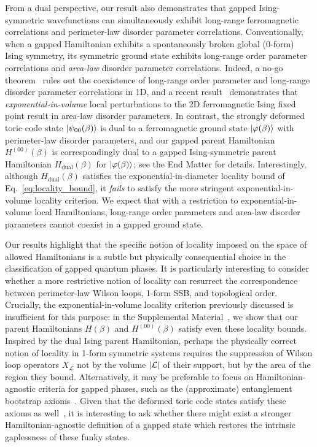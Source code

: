 \documentclass[aps,prl,twocolumn,floatfix,nofootinbib]{revtex4-2}
\theoremstyle{definition}
\begin{document}
{From a dual perspective, our result also demonstrates that gapped Ising-symmetric wavefunctions can simultaneously exhibit long-range ferromagnetic correlations and perimeter-law disorder parameter correlations. Conventionally, when a gapped Hamiltonian exhibits a spontaneously broken global (0-form) Ising symmetry, its symmetric ground state exhibits long-range order parameter correlations and \emph{area-law} disorder parameter correlations. Indeed, a no-go theorem~\cite{Levin_constraints_2020} rules out the coexistence of long-range order parameter and long-range disorder parameter correlations in 1D, and a recent result~\cite{McDonough_Zhang_lieb-robinson_2025} demonstrates that \emph{exponential-in-volume} local perturbations to the 2D ferromagnetic Ising fixed point result in area-law disorder parameters. In contrast, the strongly deformed toric code state $\ket{\psi_{00}(\beta)}$ is dual to a ferromagnetic ground state $\ket{\varphi(\beta)}$ with perimeter-law disorder parameters, and our gapped parent Hamiltonian $H^{(00)}(\beta)$ is correspondingly dual to a gapped Ising-symmetric parent Hamiltonian $H_{\text{dual}}(\beta)$ for $\ket{\varphi(\beta)}$; see the End Matter for details. Interestingly, although $H_{\text{dual}}(\beta)$ satisfies the exponential-in-diameter locality bound of Eq.~\eqref{eq:locality_bound}, it \emph{fails} to satisfy the more stringent exponential-in-volume locality criterion. We expect that with a restriction to exponential-in-volume local Hamiltonians, long-range order parameters and area-law disorder parameters cannot coexist in a gapped ground state.}

{Our results highlight that the specific notion of locality imposed on the space of allowed Hamiltonians is a subtle but physically consequential choice in the classification of gapped quantum phases. It is particularly interesting to consider whether a more restrictive notion of locality can resurrect the correspondence between perimeter-law Wilson loops, 1-form SSB, and topological order. Crucially, the exponential-in-volume locality criterion previously discussed is insufficient for this purpose: in the Supplemental Material~\cite{SOM}, we show that our parent Hamiltonians $H(\beta)$ and $H^{(00)}(\beta)$ satisfy even these locality bounds. Inspired by the dual Ising parent Hamiltonian, perhaps the physically correct notion of locality in 1-form symmetric systems requires the suppression of Wilson loop operators $X_{\mathcal{L}}$ not by the volume $\abs{\mathcal{L}}$ of their support, but by the area of the region they bound. Alternatively, it may be preferable to focus on Hamiltonian-agnostic criteria for gapped phases, such as the (approximate) entanglement bootstrap axioms~\cite{Shi_fusion_2020,Shi_Kim_2021,Kim_Lin_Ranard_Shi_2024}. Given that the deformed toric code states satisfy these axioms as well~\cite{SOM}, it is interesting to ask whether there might exist a stronger Hamiltonian-agnostic definition of a gapped state which restores the intrinsic gaplessness of these funky states.}
\end{document}
